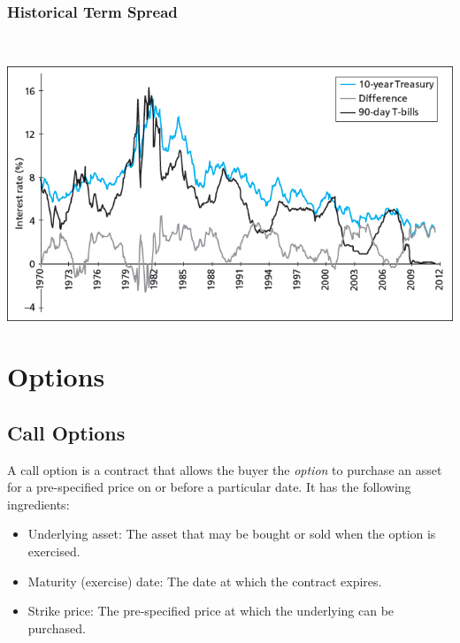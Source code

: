 \documentclass[letterpaper,10pt,english]{sphinxmanual}
\begin{document}
\subsection{Historical Term Spread}
\label{termStructure:historical-term-spread}
$\qquad$

\includegraphics[width=6in]{bod34698_1015_lg.jpg}


\chapter{Options}
\label{options::doc}\label{options:options}

\section{Call Options}
\label{options:call-options}
A call option is a contract that allows the buyer the \emph{option} to
purchase an asset for a pre-specified price on or before a particular
date.  It has the following
ingredients:
\begin{itemize}
\item {} 
Underlying asset: The asset that may be bought or sold when the
option is exercised.

\end{itemize}
\begin{itemize}
\item {} 
Maturity (exercise) date: The date at which the contract expires.

\end{itemize}
\begin{itemize}
\item {} 
Strike price: The pre-specified price at which the underlying can be
purchased.

\end{itemize}
\end{document}
